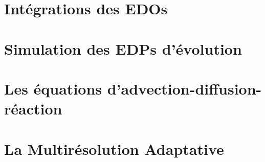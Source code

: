 \section{Intégrations des EDOs}\label{par:edo}

\section{Simulation des EDPs d'évolution}\label{par:sim_edp}

\newpage
\section{Les équations d'advection-diffusion-réaction}
\label{par:adv-diff-reaction}

\newpage
\section{La Multirésolution Adaptative}
\label{par:explication_MRA}

